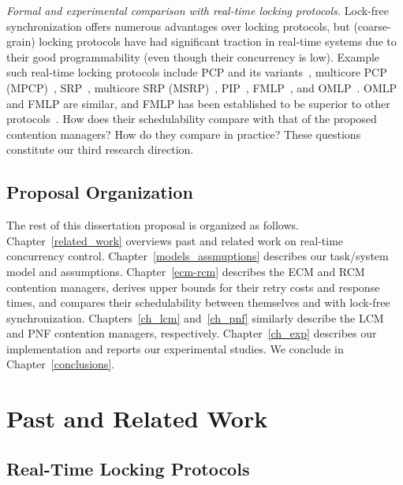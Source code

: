 \documentclass[12pt,english]{report}
\begin{document}
\textit{Formal and experimental comparison with real-time locking protocols.} Lock-free synchronization offers numerous advantages over locking protocols, but (coarse-grain) locking protocols have had significant traction in real-time systems due to their good programmability (even though their concurrency is low).  Example such real-time locking protocols include PCP and its variants~\cite{chen1990dynamic,6031129,Rajkumar:1991:SRS:532621,sha1990priority}, multicore PCP (MPCP)~\cite{lakshmanan2009coordinated,rajkumar2002real}, SRP~\cite{Buttazzo:2004:HRC:1027504, baker1991stack}, multicore SRP (MSRP)~\cite{gai2003comparison}, PIP~\cite{easwaran2009resource}, FMLP~\cite{key-4,brandenburg2008implementation,holman2006locking}, and OMLP~\cite{Baruah:2007:TMG:1338441.1338647}. OMLP and FMLP are similar, and FMLP has been established to be superior to other protocols~\cite{brandenburg2008comparison}. How does their schedulability compare with that of the proposed contention managers? How do they compare in practice? These questions constitute our third research direction. 


\section{\label{sec:proposal outline} Proposal Organization}

The rest of this dissertation proposal is organized as follows. Chapter~\ref{related_work} overviews past and related work on  real-time concurrency control. Chapter~\ref{models_assmuptions} describes our task/system model and assumptions.   Chapter~\ref{ecm-rcm} describes the ECM and RCM contention managers, derives upper bounds for their retry costs and response times, and compares their schedulability between themselves and with lock-free synchronization. Chapters~\ref{ch_lcm} and~\ref{ch_pnf} similarly describe the LCM and PNF contention managers, respectively. Chapter~\ref{ch_exp} describes our implementation and reports our experimental studies. We conclude in Chapter~\ref{conclusions}.

\chapter{\label{related_work}Past and Related Work}

\section{Real-Time Locking Protocols}
\end{document}
